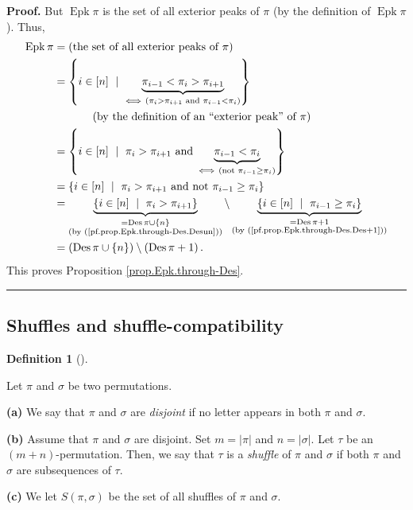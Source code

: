 \documentclass[numbers=enddot,12pt,final,onecolumn,notitlepage]{scrartcl}%
\theoremstyle{definition}
\newtheorem{defi}[theo]{Definition}
\newenvironment{definition}[1][]
{\begin{defi}[#1]\begin{leftbar}}
{\end{leftbar}\end{defi}}
\newenvironment{proof}[1][Proof]{\noindent\textbf{#1.} }{\ \rule{0.5em}{0.5em}}
\newenvironment{verlong}{}{}
\begin{document}
\begin{verlong}
\begin{proof}
But $\operatorname*{Epk}\pi$ is the set of all exterior peaks of $\pi$ (by the
definition of $\operatorname*{Epk}\pi$). Thus,%
\begin{align*}
\operatorname*{Epk}\pi &  =\left(  \text{the set of all exterior peaks of }%
\pi\right) \\
&  =\left\{  i\in\left[  n\right]  \ \mid\ \underbrace{\pi_{i-1}<\pi_{i}%
>\pi_{i+1}}_{\Longleftrightarrow\ \left(  \pi_{i}>\pi_{i+1}\text{ and }%
\pi_{i-1}<\pi_{i}\right)  }\right\} \\
&  \ \ \ \ \ \ \ \ \ \ \left(  \text{by the definition of an \textquotedblleft
exterior peak\textquotedblright\ of }\pi\right) \\
&  =\left\{  i\in\left[  n\right]  \ \mid\ \pi_{i}>\pi_{i+1}\text{ and
}\underbrace{\pi_{i-1}<\pi_{i}}_{\Longleftrightarrow\ \left(  \text{not }%
\pi_{i-1}\geq\pi_{i}\right)  }\right\} \\
&  =\left\{  i\in\left[  n\right]  \ \mid\ \pi_{i}>\pi_{i+1}\text{ and not
}\pi_{i-1}\geq\pi_{i}\right\} \\
&  =\underbrace{\left\{  i\in\left[  n\right]  \ \mid\ \pi_{i}>\pi
_{i+1}\right\}  }_{\substack{=\operatorname*{Des}\pi\cup\left\{  n\right\}
\\\text{(by (\ref{pf.prop.Epk.through-Des.Desun}))}}}\setminus
\underbrace{\left\{  i\in\left[  n\right]  \ \mid\ \pi_{i-1}\geq\pi
_{i}\right\}  }_{\substack{=\operatorname*{Des}\pi+1\\\text{(by
(\ref{pf.prop.Epk.through-Des.Des+1}))}}}\\
&  =\left(  \operatorname*{Des}\pi\cup\left\{  n\right\}  \right)
\setminus\left(  \operatorname*{Des}\pi+1\right)  .
\end{align*}
This proves Proposition \ref{prop.Epk.through-Des}.
\end{proof}
\end{verlong}

\subsection{Shuffles and shuffle-compatibility}

\begin{definition}
\label{def.shuffles}Let $\pi$ and $\sigma$ be two permutations.

\textbf{(a)} We say that $\pi$ and $\sigma$ are \textit{disjoint} if no letter
appears in both $\pi$ and $\sigma$.

\textbf{(b)} Assume that $\pi$ and $\sigma$ are disjoint. Set $m=\left\vert
\pi\right\vert $ and $n=\left\vert \sigma\right\vert $. Let $\tau$ be an
$\left(  m+n\right)  $-permutation. Then, we say that $\tau$ is a
\textit{shuffle} of $\pi$ and $\sigma$ if both $\pi$ and $\sigma$ are
subsequences of $\tau$.

\textbf{(c)} We let $S\left(  \pi,\sigma\right)  $ be the set of all shuffles
of $\pi$ and $\sigma$.
\end{definition}
\end{document}
